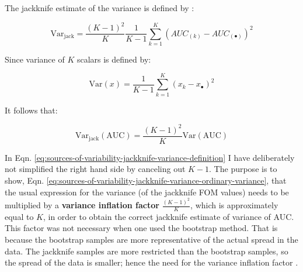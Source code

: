 \documentclass[
]{book}
\begin{document}
The jackknife estimate of the variance is defined by \citep{RN2261}:

\begin{equation} 
\text{Var}_{\text{jack}} = \frac{\left ( K-1 \right )^2}{K} \frac{1}{K-1} \sum_{k=1}^{K} \left ( AUC_{(k)} - AUC_{(\bullet)} \right )^2
\label{eq:sources-of-variability-jackknife-variance-definition}
\end{equation}

Since variance of \(K\) scalars is defined by:

\begin{equation} 
\text{Var}\left ( x \right ) = \frac{1}{K-1} \sum_{k=1}^{K} \left ( x_{k} - x_{\bullet} \right )^2
\label{eq:sources-of-variability-variance-definition}
\end{equation}

It follows that:

\begin{equation} 
\text{Var}_{\text{jack}} \left ( \text{AUC} \right ) = \frac{\left ( K-1 \right )^2}{K} \text{Var} \left ( \text{AUC} \right )
\label{eq:sources-of-variability-jackknife-variance-ordinary-variance}
\end{equation}

In Eqn. \eqref{eq:sources-of-variability-jackknife-variance-definition} I have deliberately not simplified the right hand side by canceling out \(K-1\). The purpose is to show, Eqn. \eqref{eq:sources-of-variability-jackknife-variance-ordinary-variance}, that the usual expression for the variance (of the jackknife FOM values) needs to be multiplied by a \textbf{variance inflation factor} \(\frac{\left ( K-1 \right )^2}{K}\), which is approximately equal to \(K\), in order to obtain the correct jackknife estimate of variance of AUC. This factor was not necessary when one used the bootstrap method. That is because the bootstrap samples are more representative of the actual spread in the data. The jackknife samples are more restricted than the bootstrap samples, so the spread of the data is smaller; hence the need for the variance inflation factor \citep{RN2261}.
\end{document}
